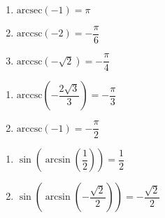 \begin{multicols}{3} 

\begin{enumerate}

\setcounter{enumi}{\value{HW}}

\item $\mbox{arcsec} \left( -1 \right) = \pi$ 
\item $\mbox{arccsc} \left( -2 \right) = -\dfrac{\pi}{6}$
\item $\mbox{arccsc} \left( -\sqrt{2} \right) = -\dfrac{\pi}{4}$

\setcounter{HW}{\value{enumi}}

\end{enumerate}

\end{multicols}

\begin{multicols}{3} 

\begin{enumerate}

\setcounter{enumi}{\value{HW}}

\item $\mbox{arccsc} \left( -\dfrac{2\sqrt{3}}{3} \right) = -\dfrac{\pi}{3}$
\item $\mbox{arccsc} \left( -1 \right) = -\dfrac{\pi}{2}$ 

\setcounter{HW}{\value{enumi}}

\end{enumerate}

\end{multicols}

\begin{multicols}{2}

\begin{enumerate}

\setcounter{enumi}{\value{HW}}

\item $\sin\left(\arcsin\left(\dfrac{1}{2}\right)\right) = \dfrac{1}{2}$ 
\item $\sin\left(\arcsin\left(-\dfrac{\sqrt{2}}{2}\right)\right) = -\dfrac{\sqrt{2}}{2}$

\setcounter{HW}{\value{enumi}}

\end{enumerate}

\end{multicols}

